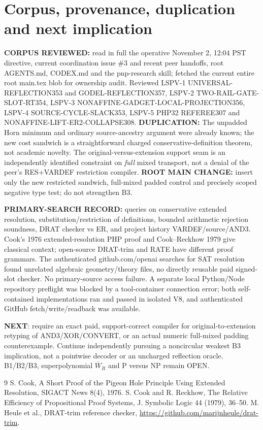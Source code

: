 \documentclass[11pt]{article}
\begin{document}
\section*{Corpus, provenance, duplication and next implication}
\noindent\textbf{CORPUS REVIEWED:} read in full the operative November 2, 12:04 PST directive, current coordination issue \#3 and recent peer handoffs, root AGENTS.md, CODEX.md and the pnp-research skill; fetched the current entire root main.tex blob for ownership audit. Reviewed LSPV-1 UNIVERSAL-REFLECTION353 and GODEL-REFLECTION357, LSPV-2 TWO-RAIL-GATE-SLOT-RT354, LSPV-3 NONAFFINE-GADGET-LOCAL-PROJECTION356, LSPV-4 SOURCE-CYCLE-SLACK353, LSPV-5 PHP32 REFEREE307 and NONAFFINE-LIFT-ER2-COLLAPSE308. \textbf{DUPLICATION:} The unpadded Horn minimum and ordinary source-ancestry argument were already known; the new cost sandwich is a straightforward charged conservative-definition theorem, not academic novelty. The original-versus-extension support seam is an independently identified constraint on \emph{full} mixed transport, not a denial of the peer's RES+VARDEF restriction compiler. \textbf{ROOT MAIN CHANGE:} insert only the new restricted sandwich, full-mixed padded control and precisely scoped negative type test; do not strengthen B3.

\noindent\textbf{PRIMARY-SEARCH RECORD:} queries on conservative extended resolution, substitution/restriction of definitions, bounded arithmetic rejection soundness, DRAT checker vs ER, and project history VARDEF/source/AND3. Cook's 1976 extended-resolution PHP proof and Cook--Reckhow 1979 give classical context; open-source DRAT-trim and RATE have different proof grammars. The authenticated github.com/openai searches for SAT resolution found unrelated algebraic geometry/theory files, no directly reusable paid signed-slot checker. No primary-source access failure. A separate local Python/Node repository preflight was blocked by a tool-container connection error; both self-contained implementations ran and passed in isolated V8, and authenticated GitHub fetch/write/readback was available.

\noindent\textbf{NEXT}: require an exact paid, support-correct compiler for original-to-extension retyping of AND3/XOR/CONVERT, or an actual numeric full-mixed padding counterexample. Continue independently pursuing a noncircular weakest B3 implication, not a pointwise decoder or an uncharged reflection oracle. B1/B2/B3, superpolynomial $\overline W_R$ and P versus NP remain OPEN.
\begin{thebibliography}{9}
 S. Cook, A Short Proof of the Pigeon Hole Principle Using Extended Resolution, SIGACT News 8(4), 1976.
 S. Cook and R. Reckhow, The Relative Efficiency of Propositional Proof Systems, J. Symbolic Logic 44 (1979), 36--50.
 M. Heule et al., DRAT-trim reference checker, \url{https://github.com/marijnheule/drat-trim}.
\end{thebibliography}
\end{document}
